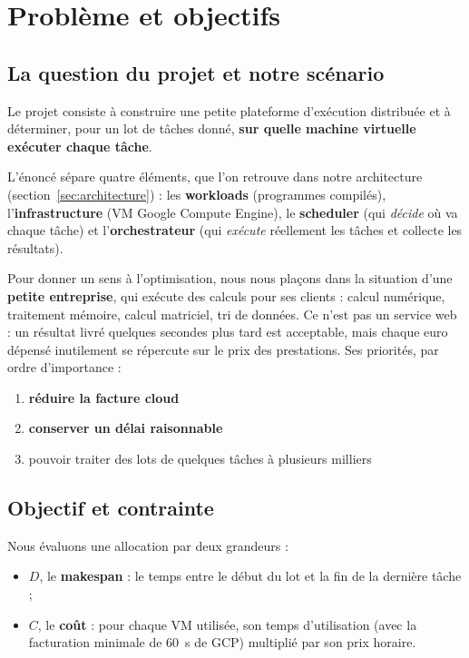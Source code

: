 \section{Problème et objectifs}

\subsection{La question du projet et notre scénario}

Le projet consiste à construire une petite plateforme d'exécution distribuée et
à déterminer, pour un lot de tâches donné, \textbf{sur quelle machine virtuelle
exécuter chaque tâche}.

L'énoncé sépare quatre éléments, que l'on retrouve dans notre architecture
(section~\ref{sec:architecture}) : les \textbf{workloads} (programmes compilés),
l'\textbf{infrastructure} (VM Google Compute Engine), le \textbf{scheduler}
(qui \emph{décide} où va chaque tâche) et l'\textbf{orchestrateur} (qui
\emph{exécute} réellement les tâches et collecte les résultats).

Pour donner un sens à l'optimisation, nous nous plaçons dans la situation
d'une \textbf{petite entreprise}, qui exécute
des calculs pour ses clients : calcul numérique, traitement mémoire, calcul
matriciel, tri de données. Ce n'est pas un service web : un résultat livré
quelques secondes plus tard est acceptable, mais chaque euro dépensé inutilement
se répercute sur le prix des prestations. Ses priorités, par ordre d'importance :
\begin{enumerate}
  \item \textbf{réduire la facture cloud}
  \item \textbf{conserver un délai raisonnable}
  \item pouvoir traiter des lots de quelques tâches à plusieurs milliers
\end{enumerate}

\subsection{Objectif et contrainte}

Nous évaluons une allocation par deux grandeurs :
\begin{itemize}
  \item $D$, le \textbf{makespan} : le temps entre le début du lot et la fin de la
        dernière tâche ;
  \item $C$, le \textbf{coût} : pour chaque VM utilisée, son temps d'utilisation
        (avec la facturation minimale de 60~s de GCP) multiplié par son prix horaire.
\end{itemize}

